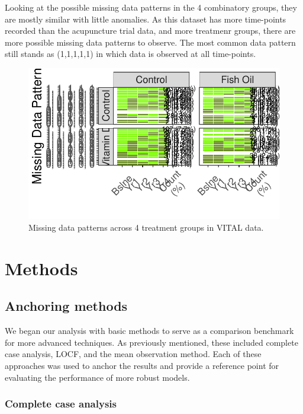 \documentclass{article}
\newcommand{\pandocbounded}[1]{#1}
\begin{document}
Looking at the possible missing data patterns in the 4 combinatory
groups, they are mostly similar with little anomalies. As this dataset
has more time-points recorded than the acupuncture trial data, and more
treatmenr groups, there are more possible missing data patterns to
observe. The most common data pattern still stands as (1,1,1,1,1) in
which data is observed at all time-points.

\begin{figure}
\centering
\pandocbounded{\includegraphics[keepaspectratio]{Final_Report_files/figure-latex/unnamed-chunk-29-1.pdf}}
\caption{Missing data patterns across 4 treatment groups in VITAL data.}
\end{figure}

\newpage

\section{Methods}\label{methods}

\subsection{Anchoring methods}\label{anchoring-methods}

We began our analysis with basic methods to serve as a comparison
benchmark for more advanced techniques. As previously mentioned, these
included complete case analysis, LOCF, and the mean observation method.
Each of these approaches was used to anchor the results and provide a
reference point for evaluating the performance of more robust models.

\subsubsection{Complete case analysis}\label{complete-case-analysis}
\end{document}
